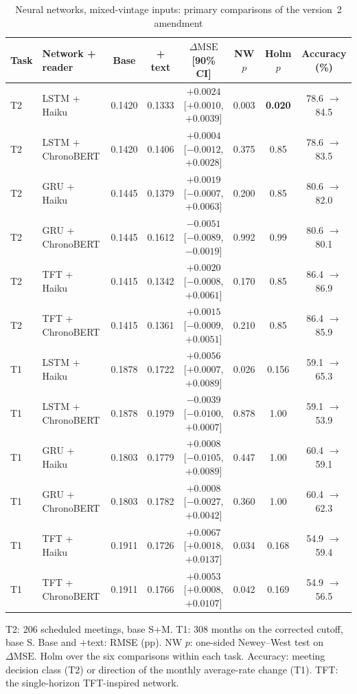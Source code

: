 \documentclass[11pt]{article}
\newcommand{\dmse}{\Delta\mathrm{MSE}}
\begin{document}
\begin{table}[ht]\centering\footnotesize\setlength{\tabcolsep}{3.5pt}
\begin{threeparttable}
\caption{Neural networks, mixed-vintage inputs: primary comparisons of the version~2 amendment}\label{tab:nets}
\begin{tabular}{llcccccc}
\toprule
Task & Network + reader & Base & + text & $\dmse$ [90\% CI] & NW $p$ & Holm $p$ & Accuracy (\%) \\ \midrule
T2 & LSTM + Haiku      & 0.1420 & 0.1333 & $+0.0024$ [$+0.0010$, $+0.0039$] & 0.003 & \textbf{0.020} & 78.6 $\to$ 84.5 \\
T2 & LSTM + ChronoBERT & 0.1420 & 0.1406 & $+0.0004$ [$-0.0012$, $+0.0028$] & 0.375 & 0.85 & 78.6 $\to$ 83.5 \\
T2 & GRU + Haiku       & 0.1445 & 0.1379 & $+0.0019$ [$-0.0007$, $+0.0063$] & 0.200 & 0.85 & 80.6 $\to$ 82.0 \\
T2 & GRU + ChronoBERT  & 0.1445 & 0.1612 & $-0.0051$ [$-0.0089$, $-0.0019$] & 0.992 & 0.99 & 80.6 $\to$ 80.1 \\
T2 & TFT + Haiku       & 0.1415 & 0.1342 & $+0.0020$ [$-0.0008$, $+0.0061$] & 0.170 & 0.85 & 86.4 $\to$ 86.9 \\
T2 & TFT + ChronoBERT  & 0.1415 & 0.1361 & $+0.0015$ [$-0.0009$, $+0.0051$] & 0.210 & 0.85 & 86.4 $\to$ 85.9 \\ \midrule
T1 & LSTM + Haiku      & 0.1878 & 0.1722 & $+0.0056$ [$+0.0007$, $+0.0089$] & 0.026 & 0.156 & 59.1 $\to$ 65.3 \\
T1 & LSTM + ChronoBERT & 0.1878 & 0.1979 & $-0.0039$ [$-0.0100$, $+0.0007$] & 0.878 & 1.00 & 59.1 $\to$ 53.9 \\
T1 & GRU + Haiku       & 0.1803 & 0.1779 & $+0.0008$ [$-0.0105$, $+0.0089$] & 0.447 & 1.00 & 60.4 $\to$ 59.1 \\
T1 & GRU + ChronoBERT  & 0.1803 & 0.1782 & $+0.0008$ [$-0.0027$, $+0.0042$] & 0.360 & 1.00 & 60.4 $\to$ 62.3 \\
T1 & TFT + Haiku       & 0.1911 & 0.1726 & $+0.0067$ [$+0.0018$, $+0.0137$] & 0.034 & 0.168 & 54.9 $\to$ 59.4 \\
T1 & TFT + ChronoBERT  & 0.1911 & 0.1766 & $+0.0053$ [$+0.0008$, $+0.0107$] & 0.042 & 0.169 & 54.9 $\to$ 56.5 \\
\bottomrule
\end{tabular}
\begin{tablenotes}\footnotesize
\item T2: 206 scheduled meetings, base S+M. T1: 308 months on the corrected cutoff, base S. Base and $+$text:
RMSE (pp). NW $p$: one-sided Newey--West test on $\dmse$. Holm over the six comparisons within each task.
Accuracy: meeting decision class (T2) or direction of the monthly average-rate change (T1). TFT: the
single-horizon TFT-inspired network.
\end{tablenotes}
\end{threeparttable}
\end{table}
\end{document}
